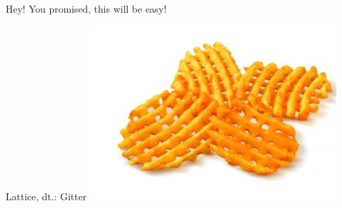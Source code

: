 \begin{frame}{Hey! You promised, this will be easy!}
    \begin{block}{Lattice, dt\@.: Gitter}
        \centering
        \includegraphics[keepaspectratio, width=\textwidth, height=0.5\textheight]{data/gitterkartoffel.jpg}
    \end{block}
\end{frame}

